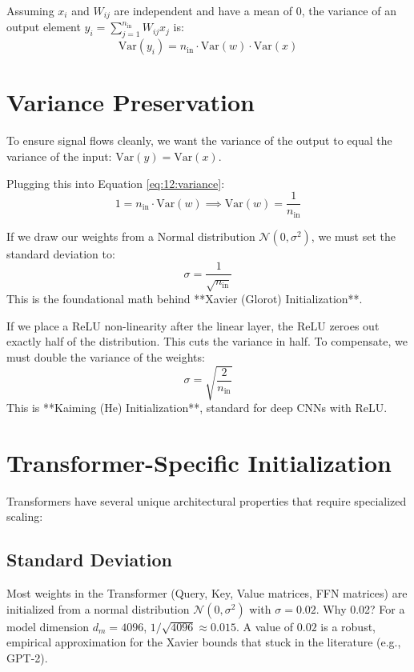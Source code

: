 Assuming $x_i$ and $W_{ij}$ are independent and have a mean of 0, the variance of an output element $y_i = \sum_{j=1}^{n_{\text{in}}} W_{ij} x_j$ is:
\begin{equation}
\label{eq:12:variance}
\text{Var}(y_i) = n_{\text{in}} \cdot \text{Var}(w) \cdot \text{Var}(x)
\end{equation}

\section{Variance Preservation}
\label{ch:12:sec:main}

To ensure signal flows cleanly, we want the variance of the output to equal the variance of the input: $\text{Var}(y) = \text{Var}(x)$. 

Plugging this into Equation \cref{eq:12:variance}:
\begin{equation}
1 = n_{\text{in}} \cdot \text{Var}(w) \implies \text{Var}(w) = \frac{1}{n_{\text{in}}}
\end{equation}

If we draw our weights from a Normal distribution $\mathcal{N}(0, \sigma^2)$, we must set the standard deviation to:
\begin{equation}
\sigma = \frac{1}{\sqrt{n_{\text{in}}}}
\end{equation}
This is the foundational math behind **Xavier (Glorot) Initialization**. 

If we place a ReLU non-linearity after the linear layer, the ReLU zeroes out exactly half of the distribution. This cuts the variance in half. To compensate, we must double the variance of the weights:
\begin{equation}
\sigma = \sqrt{\frac{2}{n_{\text{in}}}}
\end{equation}
This is **Kaiming (He) Initialization**, standard for deep CNNs with ReLU.

\section{Transformer-Specific Initialization}

Transformers have several unique architectural properties that require specialized scaling:

\subsection{Standard Deviation}
Most weights in the Transformer (Query, Key, Value matrices, FFN matrices) are initialized from a normal distribution $\mathcal{N}(0, \sigma^2)$ with $\sigma = 0.02$. Why 0.02? For a model dimension $d_m = 4096$, $1/\sqrt{4096} \approx 0.015$. A value of $0.02$ is a robust, empirical approximation for the Xavier bounds that stuck in the literature (e.g., GPT-2).

